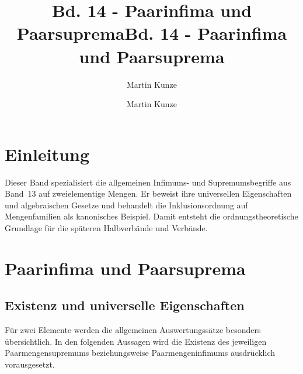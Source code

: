 \documentclass[main.tex]{subfiles}
\title{Bd. 14 - Paarinfima und Paarsuprema}
\author{Martin Kunze}
\date{}
\begin{document}
\title{Bd. 14 - Paarinfima und Paarsuprema}
\author{Martin Kunze}
\date{}
\hypersetup{pageanchor=false}
\maketitle
\hypersetup{pageanchor=true}
\setcounter{tocdepth}{3}
\tableofcontents
\setcounter{file}{14}
\renewcommand{\FormulaBandID}{14}
\providecommand{\ProofRefStack}[1]{%
  \ensuremath{\begin{gathered}[t]#1\end{gathered}}}
\chapter{Einleitung}

Dieser Band spezialisiert die allgemeinen Infimums- und Supremumsbegriffe aus
Band~13 auf zweielementige Mengen. Er beweist ihre universellen Eigenschaften
und algebraischen Gesetze und behandelt die Inklusionsordnung auf
Mengenfamilien als kanonisches Beispiel. Damit entsteht die ordnungstheoretische
Grundlage für die späteren Halbverbände und Verbände.

\chapter{Paarinfima und Paarsuprema}

\section{Existenz und universelle Eigenschaften}
Für zwei Elemente werden die allgemeinen Auswertungssätze besonders
übersichtlich. In den folgenden Aussagen wird die Existenz des jeweiligen
Paarmengensupremums beziehungsweise Paarmengeninfimums ausdrücklich
vorausgesetzt.


\end{document}
